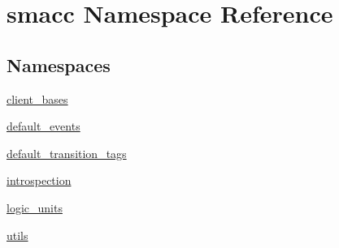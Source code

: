 \hypertarget{namespacesmacc}{}\section{smacc Namespace Reference}
\label{namespacesmacc}
\subsection*{Namespaces}
\begin{DoxyCompactItemize}
\item 
 \hyperlink{namespacesmacc_1_1client__bases}{client\+\_\+bases}
\item 
 \hyperlink{namespacesmacc_1_1default__events}{default\+\_\+events}
\item 
 \hyperlink{namespacesmacc_1_1default__transition__tags}{default\+\_\+transition\+\_\+tags}
\item 
 \hyperlink{namespacesmacc_1_1introspection}{introspection}
\item 
 \hyperlink{namespacesmacc_1_1logic__units}{logic\+\_\+units}
\item 
 \hyperlink{namespacesmacc_1_1utils}{utils}
\end{DoxyCompactItemize}
